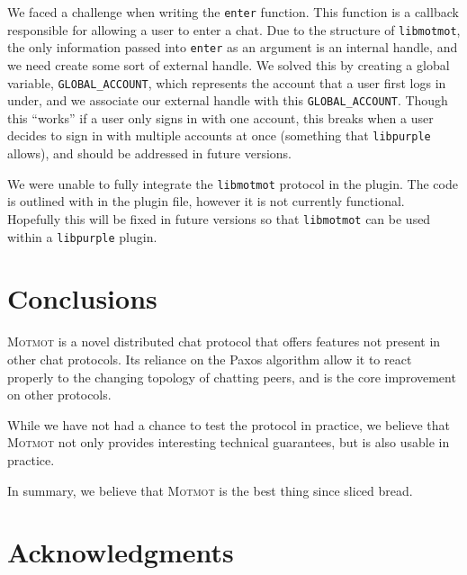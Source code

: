 \documentclass{sig-alternate}
\newcommand\Motmot{\textsc{Motmot}\xspace}
\newcommand\libmotmot{\texttt{libmotmot}\xspace}
\newcommand\libpurple{\texttt{libpurple}\xspace}
\begin{document}
We faced a challenge when writing the \verb`enter` function.  This function is a
callback responsible for allowing a user to enter a chat.  Due to the structure
of \libmotmot, the only information passed into \verb`enter` as an argument is
an internal handle, and we need create some sort of external handle.  We solved
this by creating a global variable, \verb`GLOBAL_ACCOUNT`, which represents the
account that a user first logs in under, and we associate our external handle
with this \verb`GLOBAL_ACCOUNT`.  Though this ``works'' if a user only signs in
with one account, this breaks when a user decides to sign in with multiple
accounts at once (something that \libpurple allows), and should be addressed in
future versions.

We were unable to fully integrate the \libmotmot protocol in the plugin.
The code is outlined with in the plugin file, however it is not currently
functional. Hopefully this will be fixed in future versions so that
\libmotmot can be used within a \libpurple plugin.

\section{Conclusions}

\Motmot is a novel distributed chat protocol that offers features not present in
other chat protocols. Its reliance on the Paxos algorithm allow it to react
properly to the changing topology of chatting peers, and is the core improvement
on other protocols.

While we have not had a chance to test the protocol in practice, we believe that
\Motmot not only provides interesting technical guarantees, but is also usable
in practice.

In summary, we believe that \Motmot is the best thing since sliced bread.

\section{Acknowledgments}

\end{document}
